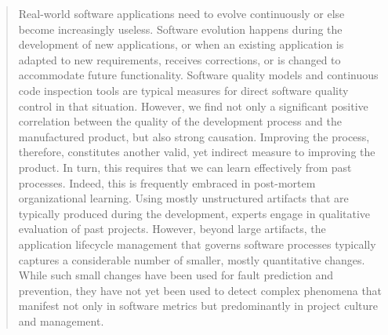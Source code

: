 \begin{abstract}
{\small
Real-world software applications need to evolve continuously or else become increasingly useless.
Software evolution happens during the development of new applications, or when an existing application is adapted to new requirements, receives corrections, or is changed to accommodate future functionality.
Software quality models and continuous code inspection tools are typical measures for direct software quality control in that situation.
However, we find not only a significant positive correlation between the quality of the development process and the manufactured product, but also strong causation.
Improving the process, therefore, constitutes another valid, yet indirect measure to improving the product.
In turn, this requires that we can learn effectively from past processes.
Indeed, this is frequently embraced in post-mortem organizational learning.
Using mostly unstructured artifacts that are typically produced during the development, experts engage in qualitative evaluation of past projects.
However, beyond large artifacts, the application lifecycle management that governs software processes typically captures a considerable number of smaller, mostly quantitative changes.
While such small changes have been used for fault prediction and prevention, they have not yet been used to detect complex phenomena that manifest not only in software metrics but predominantly in project culture and management.


}
\end{abstract}
